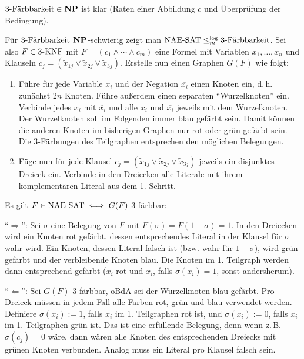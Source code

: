 \begin{Beweis}
    $\kFaerbbarkeit{3} \in \NP$ ist klar (Raten einer Abbildung $c$ und Überprüfung der Bedingung).
    
    Für $\kFaerbbarkeit{3}$ $\NP$-schwierig zeigt man $\NAESAT \le_m^{\log} \kFaerbbarkeit{3}$.
    Sei also $F \in \kKNF{3}$ mit $F = (c_1 \land \dotsb \land c_m)$ eine Formel
    mit Variablen $x_1, \dotsc, x_n$ und Klauseln
    $c_j = (\widetilde{x}_{1j} \lor \widetilde{x}_{2j} \lor \widetilde{x}_{3j})$.
    Erstelle nun einen Graphen $G(F)$ wie folgt:
    \begin{enumerate}
        \item
        Führe für jede Variable $x_i$ und der Negation $\overline{x_i}$ einen Knoten ein,
        d.\,h. zunächst $2n$ Knoten.
        Führe außerdem einen separaten "`Wurzelknoten"' ein.
        Verbinde jedes $x_i$ mit $\overline{x_i}$ und alle $x_i$ und $\overline{x_i}$ jeweils mit
        dem Wurzelknoten.
        Der Wurzelknoten soll im Folgenden immer blau gefärbt sein.
        Damit können die anderen Knoten im bisherigen Graphen nur rot oder grün gefärbt sein.
        Die 3-Färbungen des Teilgraphen entsprechen den möglichen Belegungen.
        
        \item
        Füge nun für jede Klausel
        $c_j = (\widetilde{x}_{1j} \lor \widetilde{x}_{2j} \lor \widetilde{x}_{3j})$
        jeweils ein disjunktes Dreieck ein.
        Verbinde in den Dreiecken alle Literale mit ihrem komplementären Literal aus dem
        1. Schritt.
    \end{enumerate}
    Es gilt $F \in \NAESAT \iff G(F)$ 3-färbbar:
    
    "`$\Rightarrow$"':
    Sei $\sigma$ eine Belegung von $F$ mit $F(\sigma) = F(1 - \sigma) = 1$.
    In den Dreiecken wird ein Knoten rot gefärbt, dessen entsprechendes Literal in der Klausel
    für $\sigma$ wahr wird.
    Ein Knoten, dessen Literal falsch ist (bzw. wahr für $1 - \sigma$), wird grün gefärbt
    und der verbleibende Knoten blau.
    Die Knoten im 1. Teilgraph werden dann entsprechend gefärbt
    ($x_i$ rot und $\overline{x_i}$, falls $\sigma(x_i) = 1$, sonst andersherum).
    
    "`$\Leftarrow$"':
    Sei $G(F)$ 3-färbbar, oBdA sei der Wurzelknoten blau gefärbt.
    Pro Dreieck müssen in jedem Fall alle Farben rot, grün und blau verwendet werden.
    Definiere $\sigma(x_i) := 1$, falls $x_i$ im 1. Teilgraphen rot ist, und
    $\sigma(x_i) := 0$, falls $x_i$ im 1. Teilgraphen grün ist.
    Das ist eine erfüllende Belegung, denn wenn z.\,B. $\sigma(c_j) = 0$ wäre,
    dann wären alle Knoten des entsprechenden Dreiecks mit grünen Knoten verbunden.
    Analog muss ein Literal pro Klausel falsch sein.
\end{Beweis}

